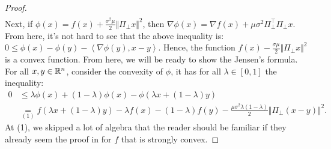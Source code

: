 \documentclass[12pt]{article}
\begin{document}
\begin{proof}
{\begin{align*}
        \end{align*}
        }
        Next, if $\phi (x) = f(x) + \frac{\sigma^2\mu}{2}\Vert \Pi_\perp x\Vert^2$, then $\nabla \phi(x) = \nabla f(x) + \mu\sigma^2\Pi_{\perp}^\top \Pi_{\perp} x$. 
        From here, it's not hard to see that the above inequality is:  $ 0\le \phi(x) - \phi(y) - \left\langle \nabla \phi(y), x - y\right\rangle$. 
        Hence, the function $f(x) - \frac{\sigma\mu}{2}\Vert \Pi_\perp x\Vert^2$ is a convex function. 
        From here, we will be ready to show the Jensen's formula. 
        For all $x, y \in \mathbb R^n$, consider the convexity of $\phi$, it has for all $\lambda \in [0, 1]$ the inequality: 
        \begin{align*}
            0 &\le \lambda \phi(x) + (1 - \lambda)\phi(x) - \phi(\lambda x + (1 - \lambda)y)
            \\
            &\underset{(1)}{=} 
            f(\lambda x + (1 - \lambda)y) - \lambda f(x) - (1 - \lambda)f(y)
            - \frac{\mu\sigma^2\lambda(1 - \lambda)}{2}\Vert \Pi_{\perp}(x - y)\Vert^2. 
        \end{align*}
        At (1), we skipped a lot of algebra that the reader should be familiar if they already seem the proof in for $f$ that is strongly convex.
    \end{proof}
\end{document}
